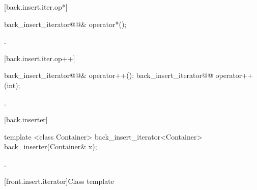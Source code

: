 [back.insert.iter.op*]{}

%
\begin{itemdecl}
back_insert_iterator@@& operator*();
\end{itemdecl}

\begin{itemdescr}
\pnum
\returns
{}.
\end{itemdescr}

[back.insert.iter.op++]{}

%
\begin{itemdecl}
back_insert_iterator@@& operator++();
back_insert_iterator@@ operator++(int);
\end{itemdecl}

\begin{itemdescr}
\pnum
\returns
{}.
\end{itemdescr}

[back.inserter]{ }

%
\begin{itemdecl}
template <class Container>
  back_insert_iterator<Container> back_inserter(Container& x);
\end{itemdecl}

\begin{itemdescr}
\pnum
\returns
{}.
\end{itemdescr}

[front.insert.iterator]{Class template }

